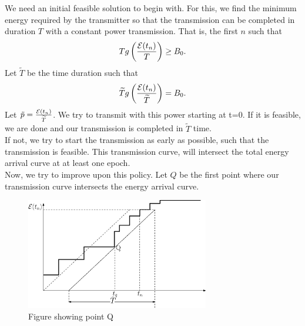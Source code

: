 We need an initial feasible solution to begin with. For this, we find the minimum energy required by the transmitter so that the transmission can be completed in duration $T$ with a constant power transmission. That is, the first $n$ such that
\begin{equation}
T g\left(\frac{\mathcal{E}(t_n)}{T}\right)\geq B_0.
\end{equation}
Let $\widetilde{T}$ be the time duration such that
\begin{equation}
\widetilde{T}g\left(\frac{\mathcal{E}(t_n)}{\widetilde{T}}\right)=B_0.
\end{equation}
Let $\tilde{p}=\frac{\mathcal{E}(t_n)}{\widetilde{T}}$. We try to transmit with this power starting at t=0. If it is feasible, we are done and our transmission is completed in $\widetilde{T}$ time.\\
If not, we try to start the transmission as early as possible, such that the transmission is feasible. This transmission curve, will intersect the total energy arrival curve at at least one epoch.\\
Now, we try to improve upon this policy. Let $Q$ be the first point where our transmission curve intersects the energy arrival curve.\\

\begin{figure}
\label{straight}
\centering
  \centerline{\includegraphics[width=8cm]{straight.eps}}
\caption{Figure showing point Q}
\end{figure}


